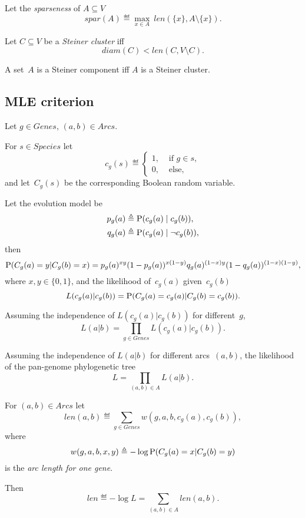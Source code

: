 \documentclass[10pt,a4paper]{article}
\theoremstyle{plain} \newtheorem{Lem}{Lemma}
\begin{document}
Let the {\em sparseness} of $A \subseteq V$ 
$$ spar(A) \eqdef \max_{x \in A} \ len(\{x\}, A \setminus \{x\}). $$

Let $C \subseteq V$ be a {\em Steiner cluster} iff
$$ diam(C) < len(C, V \setminus C). $$

A set~$A$ is a Steiner component iff $A$ is a Steiner cluster.


\subsection{MLE criterion} \label{MLECriterion}

Let $g \in Genes$,  $(a, b) \in Arcs$.

For $s \in Species$ let 
\begin{equation*}
 c_g(s) \eqdef 
  \begin{cases}
    1, &\text{ if } g \in s,\\
    0, &\text{ else},
  \end{cases}
\end{equation*}
and let~$C_g(s)$ be the corresponding Boolean random variable.

Let the evolution model be
\begin{equation} \label{pq}
\begin{split}
p_g(a) &\eqdef \P (c_g(a) \mid c_g(b)), \\
q_g(a) &\eqdef \P (c_g(a) \mid \neg c_g(b)), 
\end{split}
\end{equation}
then
\begin{equation*} 
\P(C_g(a)=y|C_g(b)=x) =  p_g(a)^{x y} (1-p_g(a))^{x (1-y)} q_g(a)^{(1-x) y}(1-q_g(a))^{(1-x)(1-y)}, 
\end{equation*}
where $x, y \in \{0, 1\}$,
and the likelihood of~$c_g(a)$ given~$c_g(b)$
$$ L(c_g(a)|c_g(b)) = \P(C_g(a)=c_g(a)|C_g(b)=c_g(b)). $$

Assuming the independence of $L(c_g(a)|c_g(b))$ for different~$g$,
$$ L(a|b) = \prod_{g \in Genes} L(c_g(a)|c_g(b)). $$

Assuming the independence of $L(a|b)$ for different arcs~$(a,b)$,
the likelihood of the pan-genome phylogenetic tree 
$$ L = \prod_{(a,b) \in A} L(a|b). $$

For $(a,b) \in Arcs$ let
$$ len(a,b) \eqdef \sum_{g \in Genes} w (g,a,b,c_g(a),c_g(b)), $$
where 
$$ w (g,a,b,x,y) \eqdef - \log \P(C_g(a)=x|C_g(b)=y) $$
is the {\em arc length for one gene}.

Then
$$ len \eqdef - \log L = \sum_{(a,b) \in A} len(a,b). $$
\end{document}
